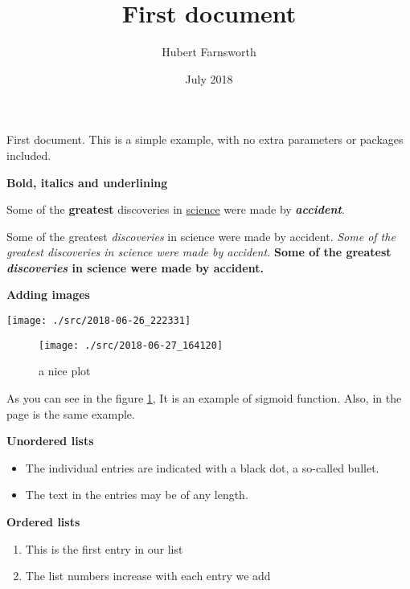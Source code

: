 \documentclass[12pt, letterpaper]{article}
\title{First document}
\author{Hubert Farnsworth}
\date{July 2018}
\begin{document}
\maketitle

\tableofcontents
First document. This is a simple example, with no 
extra parameters or packages included.

\textbf{Bold, italics and underlining}

Some of the \textbf{greatest} discoveries in \underline{science} were made by \textbf{\textit{accident}}.

Some of the greatest \emph{discoveries} in science were made by accident.
\textit{Some of the greatest \emph{discoveries} in science were made by accident.}
\textbf{Some of the greatest \emph{discoveries} in science were made by accident.}

\textbf{Adding images}

\centering
\texttt{[image: ./src/2018-06-26\_222331]}	%

\begin{figure}[ht]
	\centering
	\texttt{[image: ./src/2018-06-27\_164120]}
	\caption{a nice plot}	%
	\label{fig:plot}	%
\end{figure}

As you can see in the figure \ref{fig:plot}, It is an example of sigmoid function. Also, in the page \pageref{fig:plot} is the same example.

\textbf{Unordered lists}

\begin{itemize}
	\item The individual entries are indicated with a black dot, a so-called bullet.
	\item The text in the entries may be of any length.
\end{itemize}

\textbf{Ordered lists}

\begin{enumerate}
	\item This is the first entry in our list
	\item The list numbers increase with each entry we add
\end{enumerate}
\end{document}
